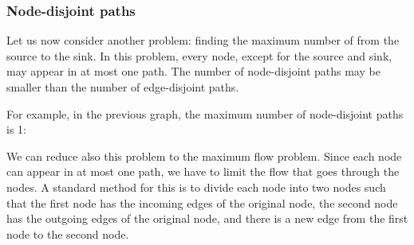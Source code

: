 \subsubsection{Node-disjoint paths}

Let us now consider another problem:
finding the maximum number of
 from the source
to the sink.
In this problem, every node,
except for the source and sink,
may appear in at most one path.
The number of node-disjoint paths
may be smaller than the number of
edge-disjoint paths.

For example, in the previous graph,
the maximum number of node-disjoint paths is 1:

\begin{center}
\end{center}

We can reduce also this problem to the maximum flow problem.
Since each node can appear in at most one path,
we have to limit the flow that goes through the nodes.
A standard method for this is to divide each node into
two nodes such that the first node has the incoming edges
of the original node, the second node has the outgoing
edges of the original node, and
there is a new edge from the first node
to the second node.


